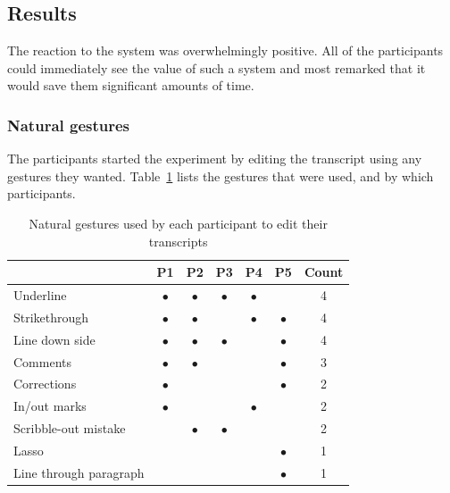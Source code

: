 \subsection{Results}
The reaction to the system was overwhelmingly positive. All of the participants could immediately see the value of such
a system and most remarked that it would save them significant amounts of time.

\subsubsection{Natural gestures}

The participants started the experiment by editing the transcript using any gestures they wanted.
Table~\ref{tab:natural-gestures} lists the gestures that were used, and by which participants.

\begin{table}[ht]
  \centering
  \begin{tabular}{|l|c|c|c|c|c|c|}
    \hline
    & P1        & P2        & P3        & P4        & P5        & Count \\
    \hline
    Underline               & $\bullet$ & $\bullet$ & $\bullet$ & $\bullet$ &           & 4 \\
    \hline
    Strikethrough           & $\bullet$ & $\bullet$ &           & $\bullet$ & $\bullet$ & 4 \\
    \hline
    Line down side          & $\bullet$ & $\bullet$ & $\bullet$ &           & $\bullet$ & 4 \\
    \hline
    Comments                & $\bullet$ & $\bullet$ &           &           & $\bullet$ & 3 \\
    \hline
    Corrections             & $\bullet$ &           &           &           & $\bullet$ & 2 \\
    \hline
    In/out marks            & $\bullet$ &           &           & $\bullet$ &           & 2 \\
    \hline
    Scribble-out mistake    &           & $\bullet$ & $\bullet$ &           &           & 2 \\
    \hline
    Lasso                   &           &           &           &           & $\bullet$ & 1 \\
    \hline
    Line through paragraph  &           &           &           &           & $\bullet$ & 1 \\
    \hline
  \end{tabular}
  \caption{Natural gestures used by each participant to edit their transcripts}
  \label{tab:natural-gestures}
\end{table}

